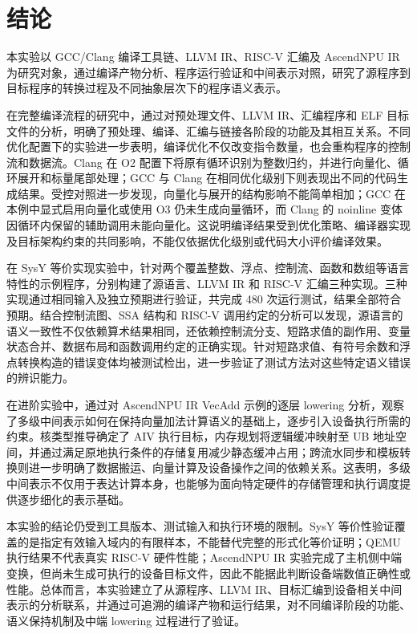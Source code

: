 \clearpage
\section{结论}
\label{sec:conclusion}

本实验以 GCC/Clang 编译工具链、LLVM IR、RISC-V 汇编及 AscendNPU IR 为研究对象，通过编译产物分析、程序运行验证和中间表示对照，研究了源程序到目标程序的转换过程及不同抽象层次下的程序语义表示。

在完整编译流程的研究中，通过对预处理文件、LLVM IR、汇编程序和 ELF 目标文件的分析，明确了预处理、编译、汇编与链接各阶段的功能及其相互关系。不同优化配置下的实验进一步表明，编译优化不仅改变指令数量，也会重构程序的控制流和数据流。Clang 在 O2 配置下将原有循环识别为整数归约，并进行向量化、循环展开和标量尾部处理；GCC 与 Clang 在相同优化级别下则表现出不同的代码生成结果。受控对照进一步发现，向量化与展开的结构影响不能简单相加；GCC 在本例中显式启用向量化或使用 O3 仍未生成向量循环，而 Clang 的 noinline 变体因循环内保留的辅助调用未能向量化。这说明编译结果受到优化策略、编译器实现及目标架构约束的共同影响，不能仅依据优化级别或代码大小评价编译效果。

在 SysY 等价实现实验中，针对两个覆盖整数、浮点、控制流、函数和数组等语言特性的示例程序，分别构建了源语言、LLVM IR 和 RISC-V 汇编三种实现。三种实现通过相同输入及独立预期进行验证，共完成 480 次运行测试，结果全部符合预期。结合控制流图、SSA 结构和 RISC-V 调用约定的分析可以发现，源语言的语义一致性不仅依赖算术结果相同，还依赖控制流分支、短路求值的副作用、变量状态合并、数据布局和函数调用约定的正确实现。针对短路求值、有符号余数和浮点转换构造的错误变体均被测试检出，进一步验证了测试方法对这些特定语义错误的辨识能力。

在进阶实验中，通过对 AscendNPU IR VecAdd 示例的逐层 lowering 分析，观察了多级中间表示如何在保持向量加法计算语义的基础上，逐步引入设备执行所需的约束。核类型推导确定了 AIV 执行目标，内存规划将逻辑缓冲映射至 UB 地址空间，并通过满足原地执行条件的存储复用减少静态缓冲占用；跨流水同步和模板转换则进一步明确了数据搬运、向量计算及设备操作之间的依赖关系。这表明，多级中间表示不仅用于表达计算本身，也能够为面向特定硬件的存储管理和执行调度提供逐步细化的表示基础。

本实验的结论仍受到工具版本、测试输入和执行环境的限制。SysY 等价性验证覆盖的是指定有效输入域内的有限样本，不能替代完整的形式化等价证明；QEMU 执行结果不代表真实 RISC-V 硬件性能；AscendNPU IR 实验完成了主机侧中端变换，但尚未生成可执行的设备目标文件，因此不能据此判断设备端数值正确性或性能。总体而言，本实验建立了从源程序、LLVM IR、目标汇编到设备相关中间表示的分析联系，并通过可追溯的编译产物和运行结果，对不同编译阶段的功能、语义保持机制及中端 lowering 过程进行了验证。
